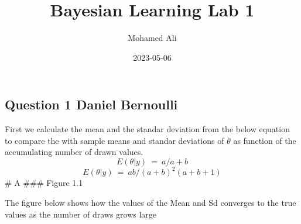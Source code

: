 \documentclass[
]{article}
\title{Bayesian Learning Lab 1}
\author{Mohamed Ali}
\date{2023-05-06}
\begin{document}
\maketitle

\hypertarget{question-1-daniel-bernoulli}{%
\subsection{Question 1 Daniel
Bernoulli}\label{question-1-daniel-bernoulli}}

First we calculate the mean and the standar deviation from the below
equation to compare the with sample means and standar deviations of
\(\theta\) as function of the accumulating number of drawn values. \[
E(\theta|y) \ =\ a/a+b
\] \[
E(\theta|y) \ =\ ab/(a+b)^2(a+b+1)
\] \# A \#\#\# Figure 1.1

The figure below shows how the values of the Mean and Sd converges to
the true values as the number of draws grows large
\end{document}
